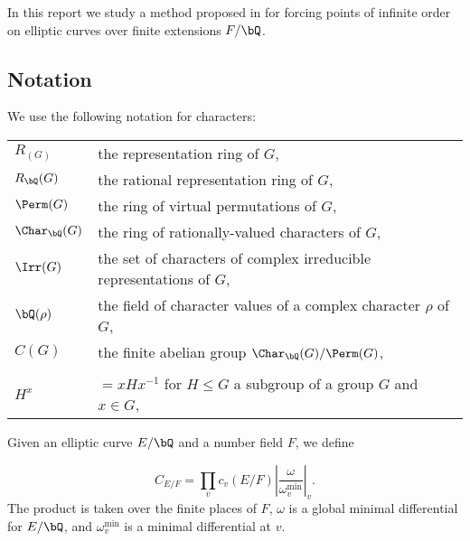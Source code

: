 In this report we study a method proposed in \cite{DEW1} for forcing points of infinite order on elliptic curves over finite extensions $F / \bQ$. 








\subsection*{Notation}
We use the following notation for characters:

\bigskip

\begin{tabular}{l | l}
    $R_(G)$ & the representation ring of $G$, \\
    $R_{\bQ}(G)$ & the rational representation ring of $G$, \\
    $\Perm(G)$ & the ring of virtual permutations of $G$, \\
    $\Char_{\bQ}(G)$ & the ring of rationally-valued characters of $G$,\\
    $\Irr(G)$ & the set of characters of complex irreducible representations of $G$, \\
    $\bQ(\rho)$ & the field of character values of a complex character $\rho$ of $G$, \\
    $C(G)$ & the finite abelian group $\Char_{\bQ}(G) / \Perm(G)$, \\ 
    \\
    $H^{x}$ & $= xHx^{-1}$  for $H \leq G$ a subgroup of a group $G$ and $x \in G$,
\end{tabular}
\vspace{2em}

Given an elliptic curve $E / \bQ$ and a number field $F$, we define

\[ C_{E / F} = \prod_v c_v(E / F) \left| \frac{\omega}{\omega_v^{\min}} \right|_v. \]
The product is taken over the finite places of $F$, $\omega$ is a global minimal differential for $E / \bQ$, and $\omega_v^{\min}$ is a minimal differential at $v$.